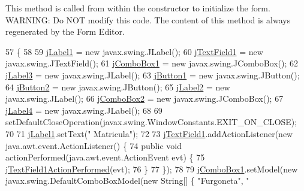 This method is called from within the constructor to initialize the form. W\+A\+R\+N\+I\+NG\+: Do N\+OT modify this code. The content of this method is always regenerated by the Form Editor. 
\begin{DoxyCode}
57                                   \{
58 
59         \mbox{\hyperlink{classejercicio2_1_1_automovil_interfaz_abccabae7351cdfccc4d45b6dc07461d1}{jLabel1}} = \textcolor{keyword}{new} javax.swing.JLabel();
60         \mbox{\hyperlink{classejercicio2_1_1_automovil_interfaz_a3775261058e376ada92aa378228174d1}{jTextField1}} = \textcolor{keyword}{new} javax.swing.JTextField();
61         \mbox{\hyperlink{classejercicio2_1_1_automovil_interfaz_af9e55c9052d02aceba060beb8283c4f2}{jComboBox1}} = \textcolor{keyword}{new} javax.swing.JComboBox();
62         \mbox{\hyperlink{classejercicio2_1_1_automovil_interfaz_aa01e4eef9c730b99950e3bbce2ecd80d}{jLabel3}} = \textcolor{keyword}{new} javax.swing.JLabel();
63         \mbox{\hyperlink{classejercicio2_1_1_automovil_interfaz_a75207245626e5d71c200b02b55319a87}{jButton1}} = \textcolor{keyword}{new} javax.swing.JButton();
64         \mbox{\hyperlink{classejercicio2_1_1_automovil_interfaz_ac92a1987525c5e7afa6eee2ae7d74787}{jButton2}} = \textcolor{keyword}{new} javax.swing.JButton();
65         \mbox{\hyperlink{classejercicio2_1_1_automovil_interfaz_a70af4ec3e989a5ed4b835e00e84690c8}{jLabel2}} = \textcolor{keyword}{new} javax.swing.JLabel();
66         \mbox{\hyperlink{classejercicio2_1_1_automovil_interfaz_a787595d150a8ebd65cb621823b577788}{jComboBox2}} = \textcolor{keyword}{new} javax.swing.JComboBox();
67         \mbox{\hyperlink{classejercicio2_1_1_automovil_interfaz_a67df57d2820e5dcd5af770822ec0c59f}{jLabel4}} = \textcolor{keyword}{new} javax.swing.JLabel();
68 
69         setDefaultCloseOperation(javax.swing.WindowConstants.EXIT\_ON\_CLOSE);
70 
71         \mbox{\hyperlink{classejercicio2_1_1_automovil_interfaz_abccabae7351cdfccc4d45b6dc07461d1}{jLabel1}}.setText(\textcolor{stringliteral}{"      Matricula"});
72 
73         \mbox{\hyperlink{classejercicio2_1_1_automovil_interfaz_a3775261058e376ada92aa378228174d1}{jTextField1}}.addActionListener(\textcolor{keyword}{new} java.awt.event.ActionListener() \{
74             \textcolor{keyword}{public} \textcolor{keywordtype}{void} actionPerformed(java.awt.event.ActionEvent evt) \{
75                 \mbox{\hyperlink{classejercicio2_1_1_automovil_interfaz_adb96511f1a6c95b416fd5a73c235d1de}{jTextField1ActionPerformed}}(evt);
76             \}
77         \});
78 
79         \mbox{\hyperlink{classejercicio2_1_1_automovil_interfaz_af9e55c9052d02aceba060beb8283c4f2}{jComboBox1}}.setModel(\textcolor{keyword}{new} javax.swing.DefaultComboBoxModel(\textcolor{keyword}{new} String[] \{ \textcolor{stringliteral}{"Furgoneta"}, \textcolor{stringliteral}{"
}
\end{DoxyCode}
